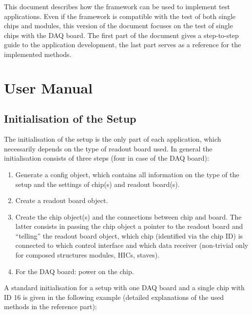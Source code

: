 \documentclass{article}
\let\oldsection\section
\renewcommand\section{\clearpage\oldsection}
\begin{document}
This document describes how the framework can be used to implement
test applications. Even if the framework is compatible with the test
of both single chips and modules, this version of the document focuses
on the test of single chips with the DAQ board. The first part of the
document gives a step-to-step guide to the application development,
the last part serves as a reference for the implemented methods. 

\section {User Manual}

\subsection{Initialisation of the Setup}

The initialisation of the setup is the only part of each application,
which necessarily depends on the type of readout board used. In
general the initialisation consists of three steps (four in case of
the DAQ board):
\begin{enumerate}
\item Generate a config object, which contains all information on the
  type of the setup and the settings of chip(s) and readout board(s). 
\item Create a readout board object.
\item Create the chip object(s) and the connections between chip and
  board. The latter consists in passing the chip object a pointer to
  the readout board and ``telling'' the readout board object, which
  chip (identified via the chip ID) is connected to which control
  interface and which data receiver (non-trivial only for composed
  structures modules, HICs, staves). 
\item For the DAQ board: power on the chip.  
\end{enumerate}

A standard initialisation for a setup with one DAQ board and a single
chip with ID 16 is given in the following example (detailed
explanations of the used methods in the reference part): 
\end{document}
